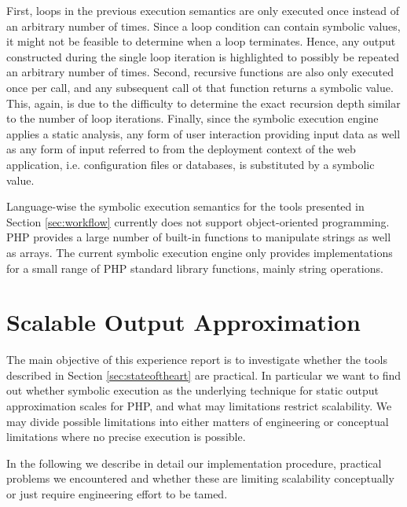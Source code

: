 \documentclass[preprint]{sig-alternate-05-2015}
\begin{document}
First, loops in the previous execution semantics are only executed once instead of an arbitrary number of times. Since a loop condition can contain symbolic values, it might not be feasible to determine when a loop terminates. Hence, any output constructed during the single loop iteration is highlighted to possibly be repeated  an arbitrary number of times. Second, recursive functions are also only executed once per call, and any subsequent call ot that function returns a symbolic value. This, again, is due to the difficulty to determine the exact recursion depth similar to the number of loop iterations. Finally, since the symbolic execution engine applies a static analysis, any form of user interaction providing input data as well as any form of input referred to from the deployment context of the web application, i.e. configuration files or databases, is substituted by a symbolic value. 

Language-wise the symbolic execution semantics for the tools presented in Section \ref{sec:workflow} currently does not support object-oriented programming. PHP provides a large number of built-in functions to manipulate strings as well as arrays. The current symbolic execution engine only provides implementations for a small range of PHP standard library functions, mainly string operations. 

\section{Scalable Output Approximation}%
The main objective of this experience report is to investigate whether the tools described in Section \ref{sec:stateoftheart} are practical. In particular we want to find out whether symbolic execution as the underlying technique for static output approximation scales for PHP, and what may limitations restrict scalability. We may divide possible limitations into either matters of engineering or conceptual limitations where no precise execution is possible. 

In the following we describe in detail our implementation procedure, practical problems we encountered and whether these are limiting scalability conceptually or just require engineering effort to be tamed.
\end{document}
